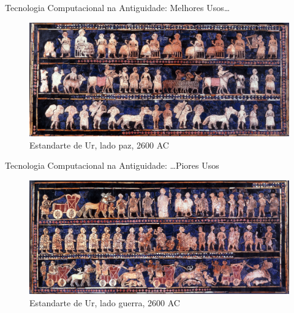 \documentclass[10pt, compress, aspectratio=169, xcolor={table,usenames,dvipsnames}]{beamer}
\begin{document}
\begin{frame}[label={sec:orga0d3e1d}]{Tecnologia Computacional na Antiguidade: Melhores Usos\dots{}}
\begin{figure}[htbp]
\centering
\includegraphics[width=\textwidth]{../../../img/ur_estandarte_paz.jpg}
\caption{Estandarte de Ur, \alert{lado paz}, 2600 AC}
\end{figure}
\end{frame}
\begin{frame}[label={sec:org972c679}]{Tecnologia Computacional na Antiguidade: \dots{}Piores Usos}
\begin{figure}[htbp]
\centering
\includegraphics[width=\textwidth]{../../../img/ur_estandarte_guerra.jpg}
\caption{Estandarte de Ur, \alert{lado guerra}, 2600 AC}
\end{figure}
\end{frame}
\end{document}
